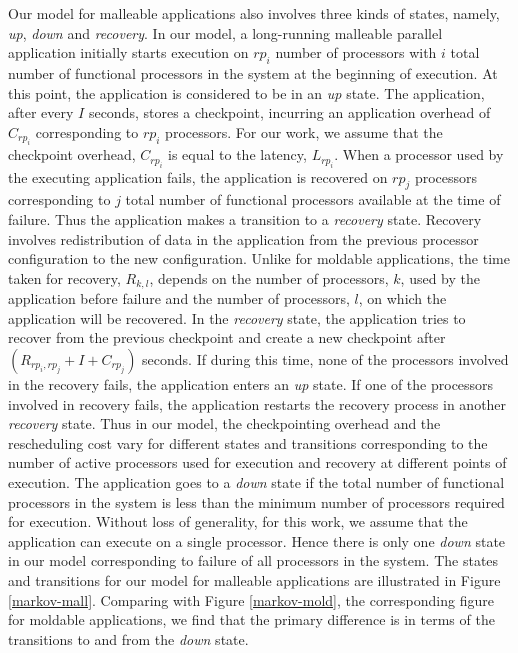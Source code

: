 \documentclass[conference,10pt]{IEEEtran}
\begin{document}
Our model for malleable applications also involves three kinds of
states, namely, {\em up}, {\em down} and {\em recovery}. In our model,
a long-running
malleable parallel application initially starts execution on $rp_i$
number of processors with $i$ total number of functional processors in
the system at the beginning of execution. At this point, the
application is considered to be in an {\em up} state. The application, after
every $I$ seconds, stores a checkpoint, incurring an application
overhead of $C_{rp_i}$ corresponding to $rp_i$ processors. For our
work, we assume that the checkpoint overhead, $C_{rp_i}$ is equal to
the latency, $L_{rp_i}$. When a processor used by the executing
application fails, the application is recovered on $rp_j$ processors
corresponding to $j$ total number of functional processors available
at the time of failure. Thus the application makes a transition to a
{\em recovery} state. Recovery involves redistribution of data in the
application from the previous processor configuration to the new
configuration. Unlike for moldable applications, the time taken for
recovery, $R_{k,l}$, depends on the number of processors, $k$, used by
the application before failure and the number of processors, $l$, on
which the application will be recovered. In the {\em recovery} state, the
application tries to recover from the previous checkpoint and create a
new checkpoint after $(R_{rp_i,rp_j}+I+C_{rp_j})$ seconds. If during
this time, none of the processors involved in the recovery fails, the
application enters an {\em up} state. If one of the processors involved in
recovery fails, the application restarts the recovery process in
another {\em recovery} state. Thus in our model, the checkpointing overhead
and the rescheduling cost vary for different states and transitions
corresponding to the number of active processors used for execution
and recovery at different points of execution. The application goes to
a {\em down} state if the total number of functional processors in the
system is less than the minimum number of processors required for
execution. Without loss of generality, for this work, we assume that
the application can execute on a single processor. Hence there is only
one {\em down} state in our model corresponding to failure of all processors
in the system.
The states and transitions for our model for malleable
applications are illustrated in Figure \ref{markov-mall}. Comparing
with Figure \ref{markov-mold}, the corresponding figure for moldable
applications, we find that the primary difference is in terms of the
transitions to and from the {\em down} state.
\end{document}
